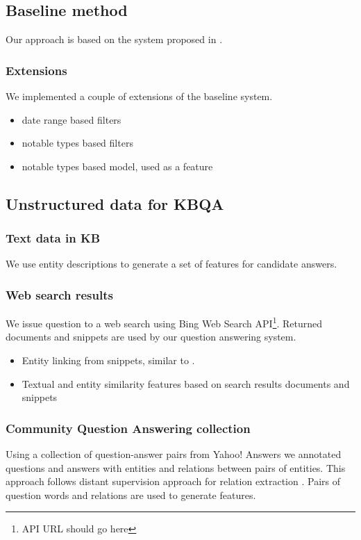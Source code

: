 
\subsection{Baseline method}
Our approach is based on the system proposed in \cite{ACCU:2015}.

\subsubsection{Extensions}
We implemented a couple of extensions of the baseline system.

\begin{itemize}
\item date range based filters
\item notable types based filters
\item notable types based model, used as a feature
\end{itemize}

\subsection{Unstructured data for KBQA}

\subsubsection{Text data in KB}
We use entity descriptions to generate a set of features for candidate answers.

\subsubsection{Web search results}
We issue question to a web search using Bing Web Search API\footnote{API URL should go here}.
Returned documents and snippets are used by our question answering system.

\begin{itemize}
\item Entity linking from snippets, similar to \cite{SMAPH_ERD:2014}.
\item Textual and entity similarity features based on search results documents and snippets
\end{itemize}

\subsubsection{Community Question Answering collection}
Using a collection of question-answer pairs from Yahoo! Answers we annotated questions and answers with entities and relations between pairs of entities.
This approach follows distant supervision approach for relation extraction \cite{savenkov-EtAl:2015:SRW}.
Pairs of question words and relations are used to generate features.

